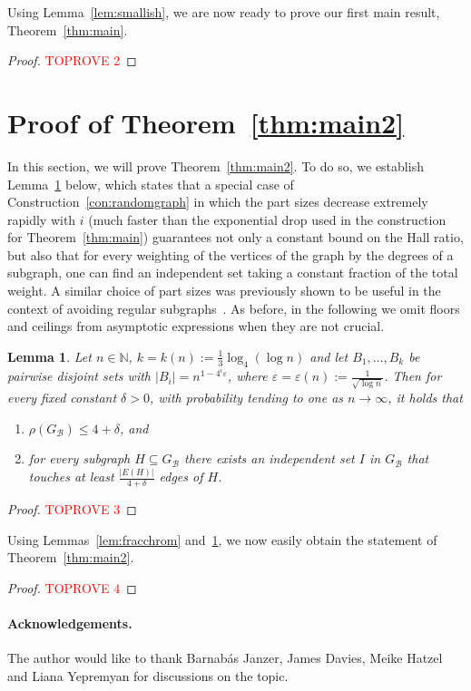 \documentclass[a4paper,10pt]{amsart}
\newtheorem{lemma}[theorem]{Lemma}
\begin{document}
Using Lemma~\ref{lem:smallish}, we are now ready to prove our first main result, Theorem~\ref{thm:main}. 
\begin{proof}\textcolor{red}{TOPROVE 2}\end{proof}

\section{Proof of Theorem~\ref{thm:main2}}\label{sec:main2}

In this section, we will prove Theorem~\ref{thm:main2}. To do so, we establish Lemma~\ref{lem:small} below, which states that a special case of Construction~\ref{con:randomgraph} in which the part sizes decrease extremely rapidly with $i$ (much faster than the exponential drop used in the construction for Theorem~\ref{thm:main}) guarantees not only a constant bound on the Hall ratio, but also that for every weighting of the vertices of the graph by the degrees of a subgraph, one can find an independent set taking a constant fraction of the total weight. A similar choice of part sizes was previously shown to be useful in the context of avoiding regular subgraphs~\cite{janzer}. As before, in the following we omit floors and ceilings from asymptotic expressions when they are not crucial. 

\begin{lemma}\label{lem:small}
Let $n\in \mathbb{N}$,  $k=k(n):=\frac{1}{3}\log_4(\log n)$ and let $B_1,\ldots,B_k$ be pairwise disjoint sets with $|B_i|=n^{1-4^i\varepsilon}$, where $\varepsilon=\varepsilon(n):=\frac{1}{\sqrt{\log n}}$. Then for every fixed constant $\delta>0$, with probability tending to one as $n\rightarrow \infty$, it holds that 
\begin{enumerate}
    \item[(a)] $\rho(G_{\mathcal{B}})\le 4+\delta$, and
    \item[(b)] for every subgraph $H\subseteq G_{\mathcal{B}}$ there exists an independent set $I$ in $G_{\mathcal{B}}$ that touches at least $\frac{|E(H)|}{4+\delta}$ edges of $H$. 
\end{enumerate}
\end{lemma}
\begin{proof}\textcolor{red}{TOPROVE 3}\end{proof}

Using Lemmas~\ref{lem:fracchrom} and~\ref{lem:small}, we now easily obtain the statement of Theorem~\ref{thm:main2}.

\begin{proof}\textcolor{red}{TOPROVE 4}\end{proof}

\paragraph*{\textbf{Acknowledgements.}} The author would like to thank Barnab\'{a}s Janzer, James Davies, Meike Hatzel and Liana Yepremyan for discussions on the topic.


\end{document}
